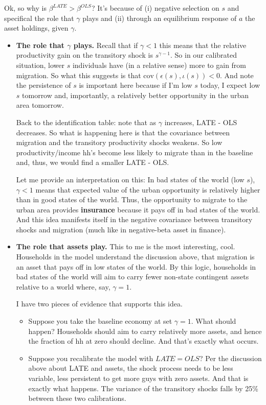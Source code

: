 \documentclass[pdftex,11pt]{article}
\begin{document}
Ok, so why is $\beta^{LATE} > \beta^{OLS}$? It's because of (i) negative selection on $s$ and specifical the role that $\gamma$ plays and (ii) through an equilibrium response of $a$ the asset holdings, given $\gamma$. 
\begin{itemize}
\item \textbf{The role that $\gamma$ plays.} Recall that if $\gamma < 1$  this means that the relative productivity gain on the transitory shock is $s^{\gamma - 1}$. So in our calibrated situation, lower $s$ individuals have (in a relative sense) more to gain from migration. So what this suggests is that $\mathrm{cov}( \epsilon(s), \iota(s)) < 0$. And note the persistence of $s$ is important here because if I'm low $s$ today, I expect low $s$ tomorrow and, importantly, a relatively better opportunity in the urban area tomorrow.

    Back to the identification table: note that as $\gamma$ increases, LATE - OLS decreases. So what is happening here is that the covariance between migration and the transitory productivity shocks weakens. So low productivity/income hh's become less likely to migrate than in the baseline and, thus, we would find a smaller LATE - OLS.

    Let me provide an interpretation on this: In bad states of the world (low $s$), $\gamma < 1$ means that expected value of the urban opportunity is relatively higher than in good states of the world. Thus, the opportunity to migrate to the urban area provides \textbf{insurance} because it pays off in bad states of the world. And this idea manifests itself in the negative covariance between transitory shocks and migration (much like in negative-beta asset in finance).
    
\item \textbf{The role that assets play.} This to me is the most interesting, cool. Households in the model understand the discussion above, that migration is an asset that pays off in low states of the world. By this logic, households in bad states of the world will aim to carry fewer non-state contingent assets relative to a world where, say, $\gamma = 1$.
    
    I have two pieces of evidence that supports this idea. 
    \begin{itemize}
    \item Suppose you take the baseline economy at set $\gamma = 1$. What should happen? Households should aim to carry relatively more assets, and hence the fraction of hh at zero should decline. And that's exactly what occurs.
    
    \item Suppose you recalibrate the model with $LATE = OLS$? Per the discussion above about LATE and assets, the shock process needs to be less variable, less persistent to get more guys with zero assets. And that is exactly what happens. The variance of the transitory shocks falls by 25\% between these two calibrations. 
    \end{itemize}
\end{itemize}
\end{document}
